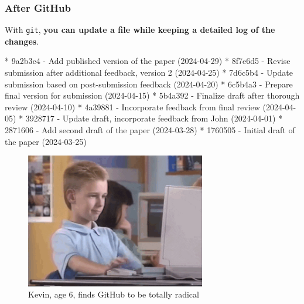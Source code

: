 \documentclass[
  letterpaper,
  DIV=11,
  numbers=noendperiod]{scrreprt}
\newenvironment{Shaded}{\begin{snugshade}}{\end{snugshade}}
\newcommand{\NormalTok}[1]{\textcolor[rgb]{0.00,0.23,0.31}{#1}}
\newcommand{\SpecialStringTok}[1]{\textcolor[rgb]{0.13,0.47,0.30}{#1}}
\begin{document}
\hypertarget{after-github}{%
\subsubsection{After GitHub}\label{after-github}}

With \texttt{git}, \textbf{you can update a file while keeping a
detailed log of the changes}.

\begin{Shaded}
\begin{Highlighting}[]
\SpecialStringTok{* }\NormalTok{9a2b3c4 {-} Add published version of the paper (2024{-}04{-}29)}
\SpecialStringTok{* }\NormalTok{8f7e6d5 {-} Revise submission after additional feedback, version 2 (2024{-}04{-}25)}
\SpecialStringTok{* }\NormalTok{7d6c5b4 {-} Update submission based on post{-}submission feedback (2024{-}04{-}20)}
\SpecialStringTok{* }\NormalTok{6c5b4a3 {-} Prepare final version for submission (2024{-}04{-}15)}
\SpecialStringTok{* }\NormalTok{5b4a392 {-} Finalize draft after thorough review (2024{-}04{-}10)}
\SpecialStringTok{* }\NormalTok{4a39881 {-} Incorporate feedback from final review (2024{-}04{-}05)}
\SpecialStringTok{* }\NormalTok{3928717 {-} Update draft, incorporate feedback from John (2024{-}04{-}01)}
\SpecialStringTok{* }\NormalTok{2871606 {-} Add second draft of the paper (2024{-}03{-}28)}
\SpecialStringTok{* }\NormalTok{1760505 {-} Initial draft of the paper (2024{-}03{-}25)}
\end{Highlighting}
\end{Shaded}

\begin{figure}

{\centering \includegraphics[width=0.7\textwidth,height=\textheight]{scripts/04_projects/project-day-1-files/thumbs_up.gif}

}

\caption{Kevin, age 6, finds GitHub to be totally radical}

\end{figure}
\end{document}
